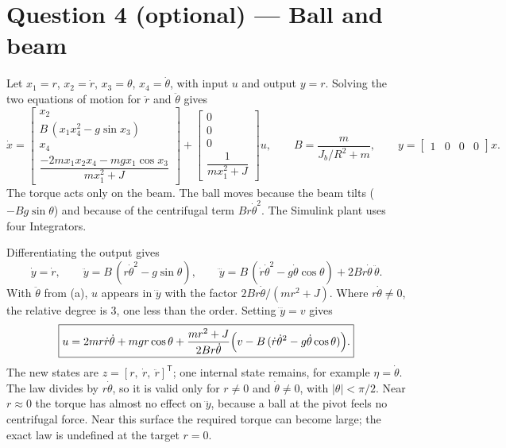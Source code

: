\section*{Question 4 (optional) --- Ball and beam}
Let $x_1=r$, $x_2=\dot r$, $x_3=\theta$, $x_4=\dot\theta$, with input $u$ and output $y=r$. Solving the two equations of motion for $\ddot r$ and $\ddot\theta$ gives
\begin{equation}
 \boxed{\dot x=
 \begin{bmatrix}x_2\\B\,(x_1x_4^2-g\sin x_3)\\x_4\\\dfrac{-2mx_1x_2x_4-mgx_1\cos x_3}{mx_1^2+J}\end{bmatrix}
 +\begin{bmatrix}0\\0\\0\\\dfrac{1}{mx_1^2+J}\end{bmatrix}u},\qquad
 B=\frac{m}{J_b/R^2+m},\qquad y=\begin{bmatrix}1&0&0&0\end{bmatrix}x.
\end{equation}
The torque acts only on the beam. The ball moves because the beam tilts ($-Bg\sin\theta$) and because of the centrifugal term $Br\dot\theta^2$. The Simulink plant uses four Integrators.

Differentiating the output gives
\begin{equation}
 \dot y=\dot r,\qquad
 \ddot y=B\,(r\dot\theta^2-g\sin\theta),\qquad
 \dddot y=B\,(\dot r\dot\theta^2-g\dot\theta\cos\theta)+2Br\dot\theta\,\ddot\theta .
\end{equation}
With $\ddot\theta$ from (a), $u$ appears in $\dddot y$ with the factor $2Br\dot\theta/(mr^2+J)$. Where $r\dot\theta\ne0$, the relative degree is 3, one less than the order. Setting $\dddot y=v$ gives
\begin{equation}
 \boxed{u=2mr\dot r\dot\theta+mgr\cos\theta+\frac{mr^2+J}{2Br\dot\theta}\Bigl(v-B\,(\dot r\dot\theta^2-g\dot\theta\cos\theta)\Bigr).}
\end{equation}
The new states are $z=[r,\ \dot r,\ \ddot r]^\mathsf{T}$; one internal state remains, for example $\eta=\dot\theta$. The law divides by $r\dot\theta$, so it is valid only for $r\ne0$ and $\dot\theta\ne0$, with $|\theta|<\pi/2$. Near $r\approx0$ the torque has almost no effect on $\dddot y$, because a ball at the pivot feels no centrifugal force. Near this surface the required torque can become large; the exact law is undefined at the target $r=0$.

